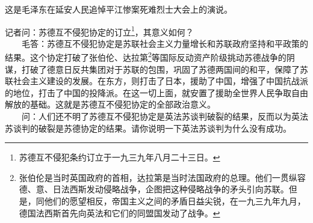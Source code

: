 \documentclass[cn,11pt,chinese]{elegantbook}
\begin{document}
\begin{introduction}\item  这是毛泽东在延安人民追悼平江惨案死难烈士大会上的演说。\end{introduction}
记者问：苏德互不侵犯协定的订立\footnote[2]{ 苏德互不侵犯条约订立于一九三九年八月二十三日。}，其意义如何？\\
　　毛答：苏德互不侵犯协定是苏联社会主义力量增长和苏联政府坚持和平政策的结果。这个协定打破了张伯伦、达拉第\footnote[3]{ 张伯伦是当时英国政府的首相，达拉第是当时法国政府的总理。他们一贯纵容德、意、日法西斯发动侵略战争，企图把这种侵略战争的矛头引向苏联。但是，同他们的愿望相反，帝国主义之间的矛盾日益尖锐，在一九三九年九月，德国法西斯首先向英法和它们的同盟国发动了战争。}等国际反动资产阶级挑动苏德战争的阴谋，打破了德意日反共集团对于苏联的包围，巩固了苏德两国间的和平，保障了苏联社会主义建设的发展。在东方，则打击了日本，援助了中国，增强了中国抗战派的地位，打击了中国的投降派。在这一切上面，就安置了援助全世界人民争取自由解放的基础。这就是苏德互不侵犯协定的全部政治意义。\\
　　问：人们还不明了苏德互不侵犯协定是英法苏谈判破裂的结果，反而以为英法苏谈判的破裂是苏德协定的结果。请你说明一下英法苏谈判为什么没有成功。\\
\end{document}
